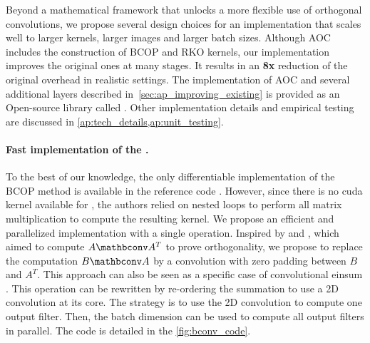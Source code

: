 \label{sec:implem}
Beyond a mathematical framework that unlocks a more flexible use of orthogonal convolutions, we propose several design choices for an implementation that scales well to larger kernels, larger images and larger batch sizes. Although AOC includes the construction of BCOP and RKO kernels, our implementation improves the original ones at many stages. It results in an \textbf{8x} reduction of the original overhead in realistic settings. The implementation of AOC and several additional layers described in~\cref{sec:ap_improving_existing} is provided as an Open-source library called \fulllibname. 
Other implementation details and empirical testing are discussed in \cref{ap:tech_details,ap:unit_testing}.


\vspace{-1mm}\paragraph{Fast implementation of the \Bconv.}\label{subsec:bconv_implem}

    To the best of our knowledge, the only differentiable implementation of the BCOP method is available in the reference code \cite{li_preventing_2019}. However, since there is no cuda kernel available for \Bconv, the authors relied on nested loops to perform all matrix multiplication to compute the resulting kernel. %
    We propose an efficient and parallelized implementation with a single operation. %
    Inspired by \cite{wang_orthogonal_2020} and \cite{delattre2023efficient}, which aimed to compute $A\mathbconv A^T$ to prove orthogonality, we propose to replace the computation $B\mathbconv A$  by a convolution with zero padding between $B$ and $A^T$. This approach can also be seen as a specific case of convolutional einsum \cite{rabbani2024conv_einsum}.
    This operation can be rewritten by re-ordering the summation to use a 2D convolution at its core. The strategy is to use the 2D convolution to compute one output filter. Then, the batch dimension can be used to compute all output filters in parallel. The code is detailed in the \cref{fig:bconv_code}.

